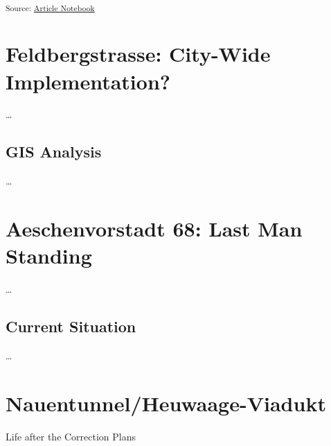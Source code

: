 \documentclass[
  letterpaper,
  DIV=11,
  numbers=noendperiod]{scrartcl}
\begin{document}
\textsubscript{Source:
\href{https://mtwente.github.io/palimpsest-bs/palimpsest-bs.qmd.html}{Article
Notebook}}

\section{Feldbergstrasse: City-Wide
Implementation?}\label{feldbergstrasse-city-wide-implementation}

\ldots{}

\subsection{GIS Analysis}\label{gis-analysis}

\ldots{}

\section{Aeschenvorstadt 68: Last Man
Standing}\label{aeschenvorstadt-68-last-man-standing}

\ldots{}

\subsection{Current Situation}\label{current-situation}

\ldots{}

\section{Nauentunnel/Heuwaage-Viadukt}\label{nauentunnelheuwaage-viadukt}

Life after the Correction Plans
\end{document}
